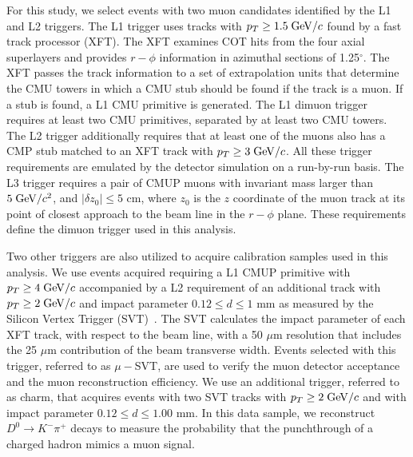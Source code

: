 \documentclass[aps,prd,preprint,floatfix,nofootinbib,superscriptaddress,showpacs,amssymb]{revtex4}
\begin{document}
 For this study, we select events with two muon candidates identified by the
 L1 and L2 triggers. The L1 trigger uses tracks with $p_T \geq 1.5 \; {\rm GeV/}c$
 found by a fast track processor (XFT). The XFT examines COT hits from the
 four axial superlayers and provides $r-\phi$ information in azimuthal
 sections of 1.25$^\circ$. The XFT passes the track information to a set of
 extrapolation units that determine the CMU towers in which a CMU stub  
 should be found if the track is a muon. If a stub is found, a L1 CMU
 primitive is generated. The L1 dimuon trigger requires at least two CMU
 primitives, separated by at least two CMU towers. The L2 trigger 
 additionally requires that at least one of the muons also has a CMP stub
 matched to an XFT track with $p_T \geq 3 \;{\rm GeV/}c$. All these trigger
 requirements are emulated by the detector simulation on a run-by-run basis.
 The L3 trigger requires a pair of CMUP muons with invariant mass larger
 than $5 \; {\rm GeV/}c^2$, and $|\delta z_0| \leq 5$ cm, where $z_0$ is the $z$
 coordinate of the muon track at its point of closest approach to the beam 
 line in the $r-\phi$ plane. These requirements define the dimuon trigger
 used in this analysis.

 Two  other triggers are also utilized to acquire calibration samples
 used in this analysis. We use events acquired requiring a L1 CMUP
 primitive with $p_T \geq 4 \; {\rm GeV/}c$ accompanied by a L2 requirement
 of an additional track with $p_T \geq 2\; {\rm GeV/}c$ and impact parameter
 $0.12\leq d \leq1$ mm as measured by the Silicon Vertex Trigger 
 (SVT)~\cite{svt}. The SVT calculates the impact parameter of each XFT
 track, with respect to the beam line, with a 50 $\mu$m resolution that
 includes the 25 $\mu$m contribution of the beam transverse width. Events
 selected with this trigger, referred to as $\mu-$SVT, are used to verify
 the muon detector acceptance and the muon reconstruction efficiency. 
 We use an additional trigger, referred to as {\sc charm}, that acquires
 events with two SVT tracks with $p_T\geq 2\; {\rm GeV/}c$ and with impact
 parameter $0.12\leq d\leq 1.00$ mm. In this data sample, we reconstruct
 $D^0 \rightarrow K^- \pi^+$ decays to measure the probability that the
 punchthrough of a charged hadron mimics a muon signal.
\end{document}
